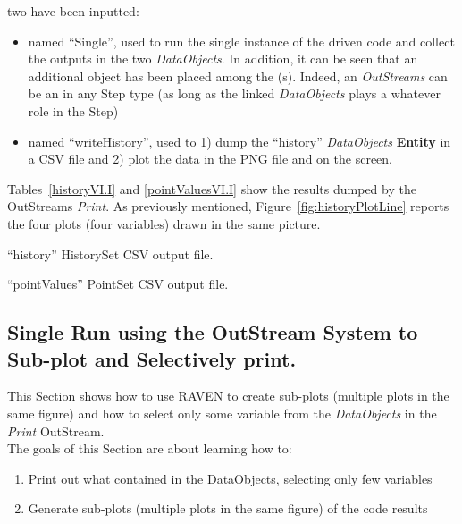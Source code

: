 \begin{enumerate}
   two  have been inputted:
   \begin{itemize}
     \item {} named ``Single'', used to run the single instance of the driven code and collect
     the outputs in the two \textit{DataObjects}. In addition, it can be seen that an additional object has been
     placed among the (s). Indeed, an  \textit{OutStreams} can be an  in
     any Step type (as long as the linked \textit{DataObjects} plays a whatever role in the Step)
     \item  {} named ``writeHistory'', used to 1) dump the ``history'' \textit{DataObjects}
     \textbf{Entity} in a CSV file and 2) plot the data in the PNG file and on the screen.
   \end{itemize}
\end{enumerate}
 Tables~\ref{historyVI.I} and \ref{pointValuesVI.I} show the results dumped by the OutStreams \textit{Print}.
 As previously mentioned, Figure~\ref{fig:historyPlotLine} reports the four plots (four variables) drawn in the same picture.
 \begin{table}[h!]
   \centering
   \caption{``history'' HistorySet CSV output file.}
   \label{historyVI.I}
 \end{table}
 \begin{table}[h!]
   \centering
   \caption{``pointValues'' PointSet CSV output file.}
   \label{pointValuesVI.I}
 \end{table}

\subsection{Single Run using the OutStream System to Sub-plot and Selectively print.}
This Section shows how to use RAVEN to create sub-plots (multiple plots in the same figure) and
how to select only some variable from the \textit{DataObjects} in the \textit{Print} OutStream.
 \\ The goals of this Section are about learning how to:
 \begin{enumerate}
   \item Print out what contained in the DataObjects, selecting only few variables
   \item Generate sub-plots (multiple plots in the same figure) of the code results
\end{enumerate}


